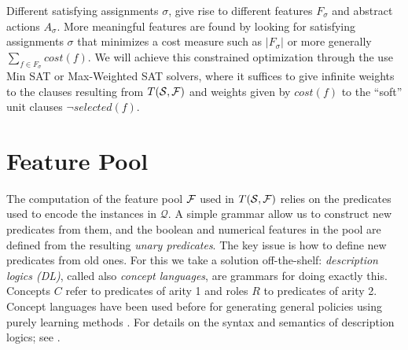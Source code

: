 \documentclass[letterpaper]{article} %
\newcommand{\Omit}[1]{}
\newtheorem{theorem}[definition]{Theorem}
\newcommand{\Q}{\mathcal{Q}}
\begin{document}
\Omit{
The goal expression $G_F$ can be provided explicitly  in terms of the primitive predicates,
but  more generally can be extracted  from the satisfying assigment $\sigma$ as well.
For this, $G_F = G_{\sigma}$ is defined as the DNF formula whose terms 
correspond to the abstract states over the selected features in $F_{\sigma}$ 
that are false in all expanded states in ${\cal S}$ marked as non-goals
and true in some expanded goal state. This DNF formula can   be simplified in standard ways. 
Due to  (\ref{d1}) and (\ref{goal}) that force the selected features in $F_{\sigma}$
to   distinguish goal  from non-goal states, we have that:

\begin{theorem}
For a satisfying assigment $\sigma$  of $T({\cal S},{\cal F})$, 
$s$ is expanded goal   state in ${\cal S}$  iff  $s$ satisfies  $G_F=G_{\sigma}$.
\end{theorem}
}


Different  satisfying  assignments $\sigma$,  give rise to different  features $F_{\sigma}$
and abstract actions $A_{\sigma}$. More meaningful features are found by looking for
satisfying assignments $\sigma$  that minimizes a cost measure such as $|F_{\sigma}|$
or  more generally $\sum_{f \in F_{\sigma}} cost(f)$. We will  achieve this  constrained
optimization through the use  Min SAT or Max-Weighted SAT solvers,  where it suffices to give
infinite weights  to the clauses resulting from $T({\cal S},{\cal F})$ and weights given by $cost(f)$ 
to the ``soft''  unit clauses  $\neg selected(f)$.

\section{Feature Pool}

The computation of the feature pool $\cal F$ used in $T({\cal S},{\cal F})$
relies on the predicates used to encode the instances in $\Q$.
A simple grammar   allow  us   to construct new predicates from them, 
and the boolean and numerical features in the pool
are defined from the resulting \emph{unary predicates}. 
The key issue is how to define new predicates from old  ones. For this 
we take a solution off-the-shelf: \emph{description logics (DL)},  called  also
\emph{concept languages},  are grammars for doing exactly this.
Concepts $C$  refer  to predicates of arity 1 and roles $R$  to predicates of arity 2.
Concept languages have been used before for  generating general policies using purely learning methods  \cite{martin:concept,fern:bias}.
For details on the syntax and semantics of description logics; see \cite{dl-handbook}.
\end{document}
